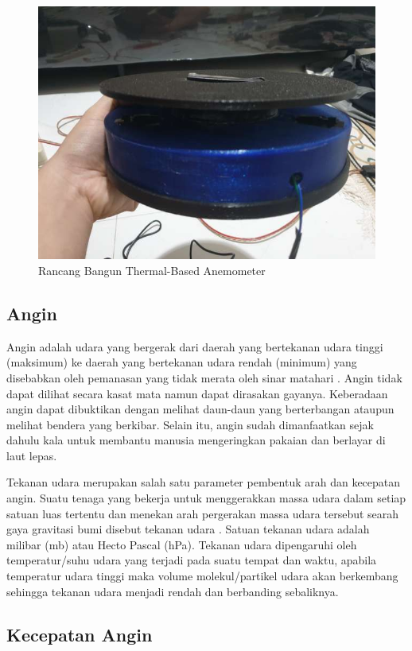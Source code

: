 \begin{figure}[h!]
	\centering
	\includegraphics[width=0.5\linewidth]{gambar/fig_alat_cahyolaksono}
	\caption{Rancang Bangun Thermal-Based Anemometer \parencite{Cahyolaksono2022}}
	\label{fig:figalatcahyolaksono}
\end{figure}

\subsection{Angin}

Angin adalah udara yang bergerak dari daerah yang bertekanan udara tinggi (maksimum) ke daerah yang bertekanan udara rendah (minimum) yang disebabkan oleh
pemanasan yang tidak merata oleh sinar matahari \parencites{turgeon2022wind}. Angin tidak 
dapat dilihat secara kasat mata namun dapat dirasakan gayanya. Keberadaan angin dapat dibuktikan dengan melihat daun-daun yang berterbangan ataupun melihat bendera yang berkibar. Selain 
itu, angin sudah dimanfaatkan sejak dahulu kala untuk membantu manusia mengeringkan pakaian dan 
berlayar di laut lepas.

Tekanan udara merupakan salah satu parameter pembentuk arah dan kecepatan angin.
Suatu tenaga yang bekerja untuk menggerakkan massa udara dalam 
setiap satuan luas tertentu dan menekan arah pergerakan massa udara tersebut searah 
gaya gravitasi bumi disebut tekanan udara \parencites{yulkifli2016pengukuran}. Satuan tekanan udara adalah milibar (mb) atau Hecto Pascal (hPa). 
Tekanan udara dipengaruhi oleh temperatur/suhu udara yang terjadi pada suatu tempat dan 
waktu, apabila temperatur udara tinggi maka volume molekul/partikel udara akan berkembang 
sehingga tekanan udara menjadi rendah dan berbanding sebaliknya. 

\subsection{Kecepatan Angin}


